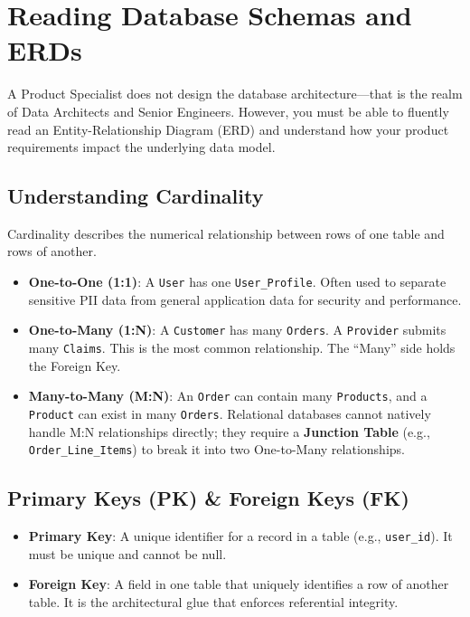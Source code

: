 \documentclass[
  11pt,
  openany,
  oneside]{book}
\providecommand{\tightlist}{%
  \setlength{\itemsep}{0pt}\setlength{\parskip}{0pt}}
\begin{document}
\bigskip

\section{Reading Database Schemas and
ERDs}\label{reading-database-schemas-and-erds}

A Product Specialist does not design the database architecture---that is
the realm of Data Architects and Senior Engineers. However, you must be
able to fluently read an Entity-Relationship Diagram (ERD) and
understand how your product requirements impact the underlying data
model.

\subsection{Understanding Cardinality}\label{understanding-cardinality}

Cardinality describes the numerical relationship between rows of one
table and rows of another.

\begin{itemize}
\tightlist
\item
  \textbf{One-to-One (1:1)}: A \texttt{User} has one
  \texttt{User\_Profile}. Often used to separate sensitive PII data from
  general application data for security and performance.
\item
  \textbf{One-to-Many (1:N)}: A \texttt{Customer} has many
  \texttt{Orders}. A \texttt{Provider} submits many \texttt{Claims}.
  This is the most common relationship. The ``Many'' side holds the
  Foreign Key.
\item
  \textbf{Many-to-Many (M:N)}: An \texttt{Order} can contain many
  \texttt{Products}, and a \texttt{Product} can exist in many
  \texttt{Orders}. Relational databases cannot natively handle M:N
  relationships directly; they require a \textbf{Junction Table} (e.g.,
  \texttt{Order\_Line\_Items}) to break it into two One-to-Many
  relationships.
\end{itemize}

\subsection{Primary Keys (PK) \& Foreign Keys
(FK)}\label{primary-keys-pk-foreign-keys-fk}

\begin{itemize}
\tightlist
\item
  \textbf{Primary Key}: A unique identifier for a record in a table
  (e.g., \texttt{user\_id}). It must be unique and cannot be null.
\item
  \textbf{Foreign Key}: A field in one table that uniquely identifies a
  row of another table. It is the architectural glue that enforces
  referential integrity.
\end{itemize}
\end{document}
